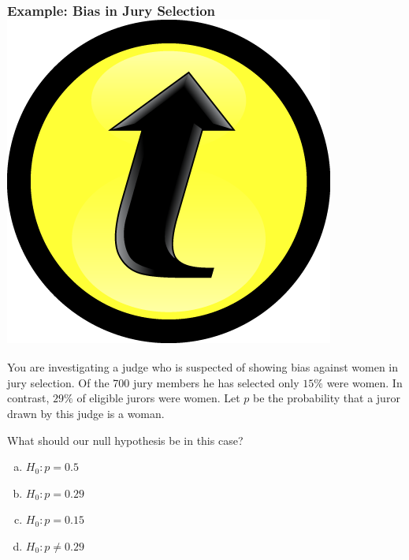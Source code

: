 \documentclass[handout]{beamer}
\begin{document}
\begin{frame}
\frametitle{Example: Bias in Jury Selection \hfill \includegraphics[scale = 0.05]{./images/clicker}}
You are investigating a judge who is suspected of showing bias against women in jury selection. Of the 700 jury members he has selected only $15\%$ were women. In contrast, $29\%$ of eligible jurors were women. Let $p$ be the probability that a juror drawn by this judge is a woman.\\

\vspace{1em}

\alert{What should our null hypothesis be in this case?}

\begin{enumerate}[(a)]
	\item $H_0\colon p = 0.5$
	\item $H_0\colon p = 0.29$
	\item $H_0\colon p = 0.15$
	\item $H_0\colon p \neq 0.29$
\end{enumerate}

\end{frame}
\end{document}
